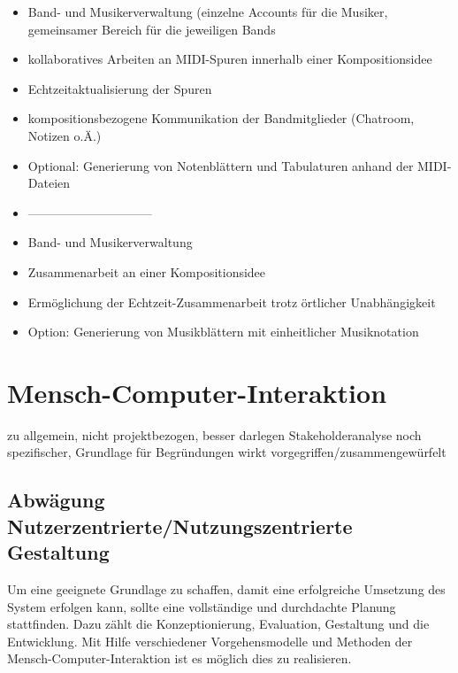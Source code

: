 \documentclass[12pt]{scrartcl}
\begin{document}
\begin{itemize}
\item Band- und Musikerverwaltung (einzelne Accounts für die Musiker, gemeinsamer Bereich für die jeweiligen Bands
\item kollaboratives Arbeiten an MIDI-Spuren innerhalb einer Kompositionsidee
\item Echtzeitaktualisierung der Spuren
\item kompositionsbezogene Kommunikation der Bandmitglieder (Chatroom, Notizen o.Ä.)
\item Optional: Generierung von Notenblättern und Tabulaturen anhand der MIDI-Dateien
\item ------------------------------
\item Band- und Musikerverwaltung
\item Zusammenarbeit an einer Kompositionsidee 
\item Ermöglichung der Echtzeit-Zusammenarbeit trotz örtlicher Unabhängigkeit
\item Option: Generierung von Musikblättern mit einheitlicher Musiknotation
\end{itemize}









\section{Mensch-Computer-Interaktion}

zu allgemein, nicht projektbezogen, besser darlegen
Stakeholderanalyse noch spezifischer, Grundlage für Begründungen
wirkt vorgegriffen/zusammengewürfelt

\subsection{Abwägung Nutzerzentrierte/Nutzungszentrierte Gestaltung}
Um eine geeignete Grundlage zu schaffen, damit eine erfolgreiche Umsetzung des System erfolgen kann, sollte eine vollständige und durchdachte Planung stattfinden. Dazu zählt die Konzeptionierung, Evaluation, Gestaltung und die Entwicklung. 
Mit Hilfe verschiedener Vorgehensmodelle und Methoden der Mensch-Computer-Interaktion ist es möglich dies zu realisieren.
\end{document}
